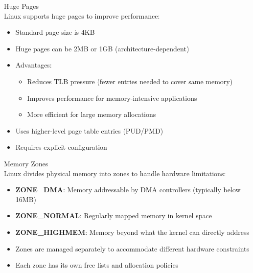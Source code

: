 \begin{definition}{Huge Pages}\\
    Linux supports huge pages to improve performance:
    \begin{itemize}
        \item Standard page size is 4KB
        \item Huge pages can be 2MB or 1GB (architecture-dependent)
        \item Advantages:
            \begin{itemize}
                \item Reduces TLB pressure (fewer entries needed to cover same memory)
                \item Improves performance for memory-intensive applications
                \item More efficient for large memory allocations
            \end{itemize}
        \item Uses higher-level page table entries (PUD/PMD)
        \item Requires explicit configuration
    \end{itemize}
\end{definition}

\begin{definition}{Memory Zones}\\
    Linux divides physical memory into zones to handle hardware limitations:
    \begin{itemize}
        \item \textbf{ZONE\_DMA}: Memory addressable by DMA controllers (typically below 16MB)
        \item \textbf{ZONE\_NORMAL}: Regularly mapped memory in kernel space
        \item \textbf{ZONE\_HIGHMEM}: Memory beyond what the kernel can directly address
        \item Zones are managed separately to accommodate different hardware constraints
        \item Each zone has its own free lists and allocation policies
    \end{itemize}
\end{definition}

